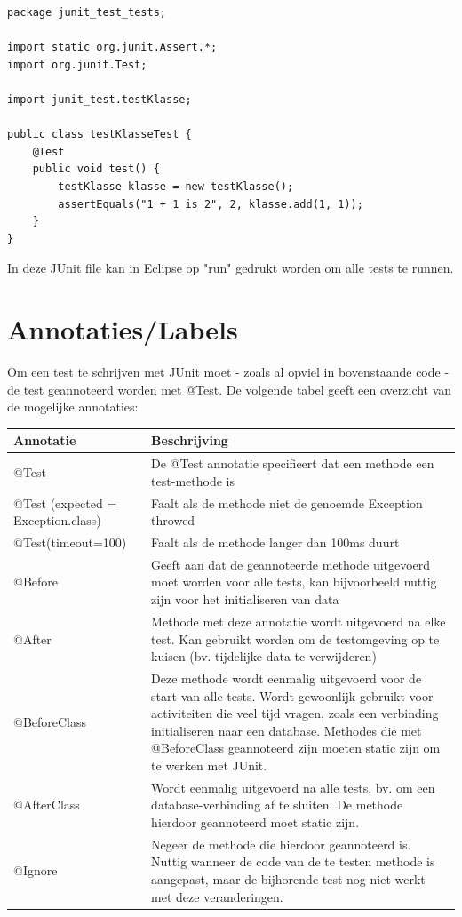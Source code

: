 \documentclass{book}
\begin{document}
\begin{lstlisting}
package junit_test_tests;

import static org.junit.Assert.*;
import org.junit.Test;

import junit_test.testKlasse;

public class testKlasseTest {
	@Test
	public void test() {
		testKlasse klasse = new testKlasse();
		assertEquals("1 + 1 is 2", 2, klasse.add(1, 1));
	}
}
\end{lstlisting}

In deze JUnit file kan in Eclipse op "run" gedrukt worden om alle tests te runnen. 

\section{Annotaties/Labels}

Om een test te schrijven met JUnit moet - zoals al opviel in bovenstaande code - de test geannoteerd worden met @Test. De volgende tabel geeft een overzicht van de mogelijke annotaties:

\begin{center}
    \begin{tabularx}{\textwidth}{|X|X|}
    \hline
    Annotatie & Beschrijving \\ \hline
    @Test & De @Test annotatie specifieert dat een methode een test-methode is \\ \hline
    @Test (expected = Exception.class) & Faalt als de methode niet de genoemde Exception throwed \\ \hline
    @Test(timeout=100) & Faalt als de methode langer dan 100ms duurt \\ \hline
    @Before & Geeft aan dat de geannoteerde methode uitgevoerd moet worden voor alle tests, kan bijvoorbeeld nuttig zijn voor het initialiseren van data \\ \hline
    @After & Methode met deze annotatie wordt uitgevoerd na elke test. Kan gebruikt worden om de testomgeving op te kuisen (bv. tijdelijke data te verwijderen) \\ \hline
    @BeforeClass & Deze methode wordt eenmalig uitgevoerd voor de start van alle tests. Wordt gewoonlijk gebruikt voor activiteiten die veel tijd vragen, zoals een verbinding initialiseren naar een database. Methodes die met @BeforeClass geannoteerd zijn moeten static zijn om te werken met JUnit. \\ \hline
    @AfterClass & Wordt eenmalig uitgevoerd na alle tests, bv. om een database-verbinding af te sluiten. De methode hierdoor geannoteerd moet static zijn. \\ \hline
    @Ignore & Negeer de methode die hierdoor geannoteerd is. Nuttig wanneer de code van de te testen methode is aangepast, maar de bijhorende test nog niet werkt met deze veranderingen. \\ \hline
    \end{tabularx}
\end{center}
\end{document}
